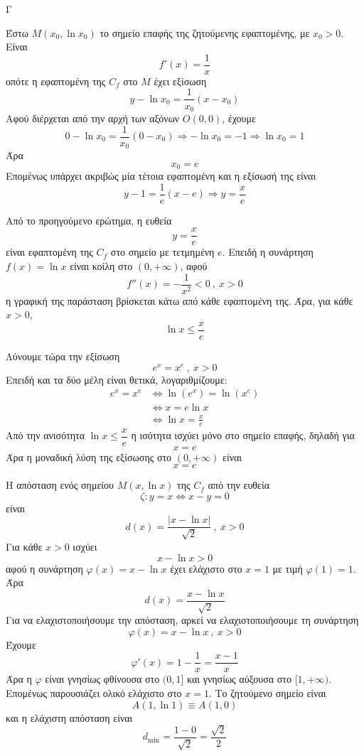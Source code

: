 \begin{thema}{Γ}
\begin{erwthma}
\item Έστω $M(x_0,\ln x_0)$ το σημείο επαφής της ζητούμενης εφαπτομένης, με $x_0>0$.
Είναι
\[f'(x)=\frac{1}{x}\]
οπότε η εφαπτομένη της $C_f$ στο $M$ έχει εξίσωση
\[y-\ln x_0=\frac{1}{x_0}(x-x_0)\]
Αφού διέρχεται από την αρχή των αξόνων $O(0,0)$, έχουμε
\[0-\ln x_0=\frac{1}{x_0}(0-x_0)\Rightarrow -\ln x_0=-1\Rightarrow \ln x_0=1\]
Άρα
\[x_0=e\]
Επομένως υπάρχει ακριβώς μία τέτοια εφαπτομένη και η εξίσωσή της είναι
\[y-1=\frac{1}{e}(x-e)\Rightarrow y=\frac{x}{e}\]

\item Από το προηγούμενο ερώτημα, η ευθεία
\[y=\frac{x}{e}\]
είναι εφαπτομένη της $C_f$ στο σημείο με τετμημένη $e$.
Επειδή η συνάρτηση $f(x)=\ln x$ είναι κοίλη στο $(0,+\infty)$, αφού
\[f''(x)=-\frac{1}{x^2}<0\ ,\ x>0\]
η γραφική της παράσταση βρίσκεται κάτω από κάθε εφαπτομένη της.
Άρα, για κάθε $x>0$,
\[\ln x\leq \frac{x}{e}\]

Λύνουμε τώρα την εξίσωση
\[e^x=x^e\ ,\ x>0\]
Επειδή και τα δύο μέλη είναι θετικά, λογαριθμίζουμε:
\begin{align*}
e^x=x^e
&\Leftrightarrow \ln(e^x)=\ln(x^e)\\
&\Leftrightarrow x=e\ln x\\
&\Leftrightarrow \ln x=\frac{x}{e}
\end{align*}
Από την ανισότητα $\ln x\leq\dfrac{x}{e}$ η ισότητα ισχύει μόνο στο σημείο επαφής, δηλαδή για
\[x=e\]
Άρα η μοναδική λύση της εξίσωσης στο $(0,+\infty)$ είναι
\[x=e\]

\item Η απόσταση ενός σημείου $M(x,\ln x)$ της $C_f$ από την ευθεία
\[\zeta:y=x\Leftrightarrow x-y=0\]
είναι
\[d(x)=\frac{|x-\ln x|}{\sqrt{2}}\ ,\ x>0\]
Για κάθε $x>0$ ισχύει
\[x-\ln x>0\]
αφού η συνάρτηση $\varphi(x)=x-\ln x$ έχει ελάχιστο στο $x=1$ με τιμή $\varphi(1)=1$.
Άρα
\[d(x)=\frac{x-\ln x}{\sqrt{2}}\]
Για να ελαχιστοποιήσουμε την απόσταση, αρκεί να ελαχιστοποιήσουμε τη συνάρτηση
\[\varphi(x)=x-\ln x\ ,\ x>0\]
Έχουμε
\[\varphi'(x)=1-\frac{1}{x}=\frac{x-1}{x}\]
Άρα η $\varphi$ είναι γνησίως φθίνουσα στο $(0,1]$ και γνησίως αύξουσα στο $[1,+\infty)$.
Επομένως παρουσιάζει ολικό ελάχιστο στο $x=1$.
Το ζητούμενο σημείο είναι
\[A(1,\ln 1)\equiv A(1,0)\]
και η ελάχιστη απόσταση είναι
\[d_{\min}=\frac{1-0}{\sqrt{2}}=\frac{\sqrt{2}}{2}\]


\end{erwthma}
\end{thema}
